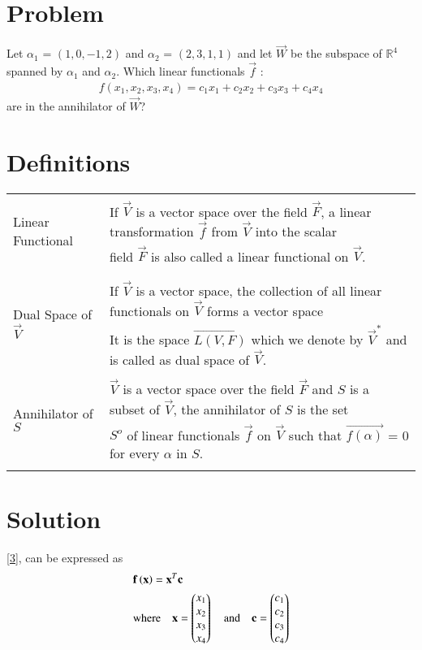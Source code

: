 \documentclass[journal,12pt,twocolumn]{IEEEtran}
\newcommand\myemptypage{
	\null
	\thispagestyle{empty}
	\addtocounter{page}{-1}
	\newpage
}
\begin{document}
\section{Problem}
Let $\alpha_1$ = $(1, 0,-1, 2)$ and $\alpha_2$ = $(2,3, 1,1)$ and let $\vec{W}$ be the subspace of $\mathbb{R}^4$ spanned by $\alpha_1$ and $\alpha_2$. Which linear functionals $\vec{f}$ :
\begin{align}
f(x_1,x_2,x_3,x_4) = c_1x_1 + c_2x_2 + c_3x_3 + c_4x_4 \label{3} 
\end{align}
are in the annihilator of $\vec{W}$?
\section{Definitions}
\begin{table}[hp]
	\begin{tabular}{|l|l|}
		\hline
		\multirow{3}{*}{Linear Functional} & \\
		& If $\vec{V}$ is a vector space over the field $\vec{F}$, a linear transformation $\vec{f}$ from $\vec{V}$
		into the scalar \\
		& field $\vec{F}$ is also called a linear functional on $\vec{V}$. \\
		& \\
		\hline
		\multirow{3}{*}{Dual Space of $\vec{V}$} & \\
		& If $\vec{V}$ is a vector space, the collection of all linear functionals on $\vec{V}$ forms a vector space\\
		& It is the space $\vec{L(V, F)}$ which we denote by $\vec{V}^{*}$ and is called as dual space of $\vec{V}$.\\
		\hline
		\multirow{3}{*}{Annihilator of $S$} & \\
		& $\vec{V}$ is a vector space over the field $\vec{F}$ and $S$ is a subset of $\vec{V}$, the annihilator of $S$ is the set \\
		& $S^{o}$ of linear functionals $\vec{f}$ on $\vec{V}$ such that $\vec{f(\alpha)}$ = 0 for every $\alpha$ in $S$. \\
		& \\
		\hline
	\end{tabular}
\end{table}
\section{Solution}
\pagebreak
\myemptypage
\eqref{3}, can be expressed as
\begin{align}
& \mathbf{f}\left(\mathbf{x}\right) = \mathbf{x}^T\mathbf{c} \\
& \text{where} \quad \mathbf{x} = \begin{pmatrix}x_1 \\ x_2 \\ x_3 \\ x_4\end{pmatrix} \quad \text{and} \quad \mathbf{c} = \begin{pmatrix}c_1 \\ c_2 \\ c_3 \\ c_4\end{pmatrix}
\end{align}
 
\end{document}
